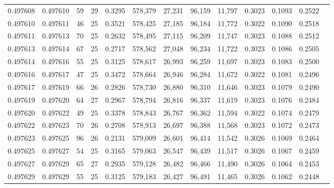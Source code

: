 \begin{tabular}{rrrrrrrrrrrrr}
0.497608 & 0.497610 &  59 &  29 &                                     0.3295 & 578,379 &  27,231 &  96,159 &  11,797 & 0.3023 & 0.1093 & 0.2522 \\
0.497610 & 0.497611 &  46 &  25 &                                     0.3521 & 578,425 &  27,185 &  96,184 &  11,772 & 0.3022 & 0.1090 & 0.2518 \\
0.497611 & 0.497613 &  70 &  25 &                                     0.2632 & 578,495 &  27,115 &  96,209 &  11,747 & 0.3023 & 0.1088 & 0.2512 \\
0.497613 & 0.497614 &  67 &  25 &                                     0.2717 & 578,562 &  27,048 &  96,234 &  11,722 & 0.3023 & 0.1086 & 0.2505 \\
0.497614 & 0.497616 &  55 &  25 &                                     0.3125 & 578,617 &  26,993 &  96,259 &  11,697 & 0.3023 & 0.1083 & 0.2500 \\
0.497616 & 0.497617 &  47 &  25 &                                     0.3472 & 578,664 &  26,946 &  96,284 &  11,672 & 0.3022 & 0.1081 & 0.2496 \\
0.497617 & 0.497619 &  66 &  26 &                                     0.2826 & 578,730 &  26,880 &  96,310 &  11,646 & 0.3023 & 0.1079 & 0.2490 \\
0.497619 & 0.497620 &  64 &  27 &                                     0.2967 & 578,794 &  26,816 &  96,337 &  11,619 & 0.3023 & 0.1076 & 0.2484 \\
0.497620 & 0.497622 &  49 &  25 &                                     0.3378 & 578,843 &  26,767 &  96,362 &  11,594 & 0.3022 & 0.1074 & 0.2479 \\
0.497622 & 0.497623 &  70 &  26 &                                     0.2708 & 578,913 &  26,697 &  96,388 &  11,568 & 0.3023 & 0.1072 & 0.2473 \\
0.497623 & 0.497625 &  96 &  26 &                                     0.2131 & 579,009 &  26,601 &  96,414 &  11,542 & 0.3026 & 0.1069 & 0.2464 \\
0.497625 & 0.497627 &  54 &  25 &                                     0.3165 & 579,063 &  26,547 &  96,439 &  11,517 & 0.3026 & 0.1067 & 0.2459 \\
0.497627 & 0.497629 &  65 &  27 &                                     0.2935 & 579,128 &  26,482 &  96,466 &  11,490 & 0.3026 & 0.1064 & 0.2453 \\
0.497629 & 0.497629 &  55 &  25 &                                     0.3125 & 579,183 &  26,427 &  96,491 &  11,465 & 0.3026 & 0.1062 & 0.2448 \\

\end{tabular}
